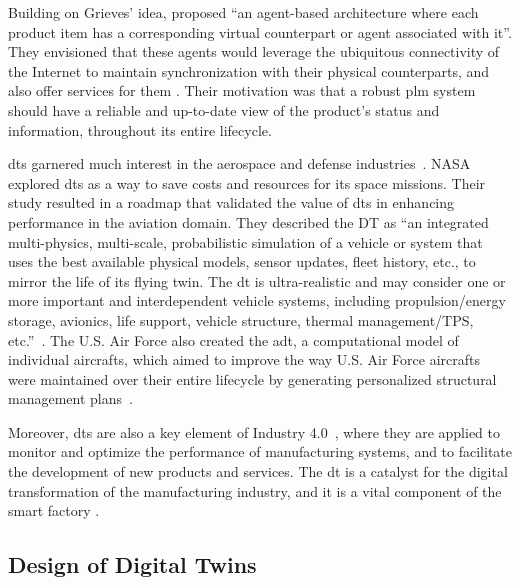 Building on Grieves' idea, \textcite{framlingProductAgentsHandling2003} proposed ``an agent-based architecture where each product item has a corresponding virtual counterpart or agent associated with it''. They envisioned that these agents would leverage the ubiquitous connectivity of the Internet to maintain synchronization with their physical counterparts, and also offer services for them \parencite{framlingProductAgentsHandling2003}. Their motivation was that a robust \acrshort{plm} system should have a reliable and up-to-date view of the product's status and information, throughout its entire lifecycle.

\acrshort{dt}s garnered much interest in the aerospace and defense industries~\parencite{negriReviewRolesDigital2017}. NASA explored \acrshort{dt}s as a way to save costs and resources for its space missions. Their study resulted in a roadmap that validated the value of \acrshort{dt}s in enhancing performance in the aviation domain. They described the DT as ``an integrated multi-physics, multi-scale, probabilistic simulation of a vehicle or system that uses the best available physical models, sensor updates, fleet history, etc., to mirror the life of its flying twin. The \acrshort{dt} is ultra-realistic and may consider one or more important and interdependent vehicle systems, including propulsion/energy storage, avionics, life support, vehicle structure, thermal management/TPS, etc.''~\parencite{shaftoModelingSimulationInformation2010}. The U.S. Air Force also created the \acrfull{adt}, a computational model of individual aircrafts, which aimed to improve the way U.S. Air Force aircrafts were maintained over their entire lifecycle by generating personalized structural management plans~\parencite{tuegelAirframeDigitalTwin2012,gockelChallengesStructuralLife2012}.

Moreover, \acrshort{dt}s are also a key element of Industry 4.0~\parencite{brettelHowVirtualizationDecentralization2014,hermannDesignPrinciplesIndustrie2016,vachalekDigitalTwinIndustrial2017,negriReviewRolesDigital2017}, where they are applied to monitor and optimize the performance of manufacturing systems, and to facilitate the development of new products and services. The \acrshort{dt} is a catalyst for the digital transformation of the manufacturing industry, and it is a vital component of the smart factory \parencite{mabkhotRequirementsSmartFactory2018}.

\subsection{Design of Digital Twins}\label{sec:dt_design}

